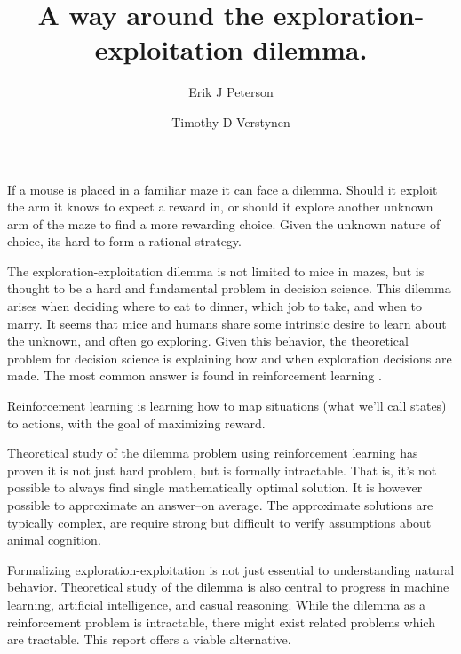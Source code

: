 \documentclass[9pt,twocolumn,twoside]{pnas-new}
\title{A way around the exploration-exploitation dilemma.}
\author[a,1]{Erik J Peterson}
\author[a,b]{Timothy D Verstynen}
\affil[a]{Department of Psychology}
\affil[b]{Center for the Neural Basis of Cognition, Carnegie Mellon University, Pittsburgh PA}
\begin{document}
\verticaladjustment{-2pt}
\maketitle


\thispagestyle{firststyle}
If a mouse is placed in a familiar maze it can face a dilemma. Should it exploit the arm it knows to expect a reward in, or should it explore another unknown arm of the maze to find a more rewarding choice. Given the unknown nature of choice, its hard to form a rational strategy. 

The exploration-exploitation dilemma is not limited to mice in mazes, but is thought to be a hard and fundamental problem in decision science. This dilemma arises when deciding where to eat to dinner, which job to take, and when to marry. It seems that mice and humans share some intrinsic desire to learn about the unknown, and often go exploring. Given this behavior, the theoretical problem for decision science is explaining how and when exploration decisions are made. The most common answer is found in reinforcement learning \cite{Sutton2018a}. 

Reinforcement learning is learning how to map situations (what we'll call states) to actions, with the goal of maximizing reward. 

Theoretical study of the dilemma problem using reinforcement learning has proven it is not just hard problem, but is formally intractable. That is, it's not possible to always find single mathematically optimal solution. It is however possible to approximate an answer--on average. The approximate solutions are typically complex, are require strong but difficult to verify assumptions about animal cognition. 

Formalizing exploration-exploitation is not just essential to understanding natural behavior. Theoretical study of the dilemma is also central to progress in machine learning, artificial intelligence, and casual reasoning. While the dilemma as a reinforcement problem is intractable, there might exist related problems which are tractable. This report offers a viable alternative.
\end{document}
